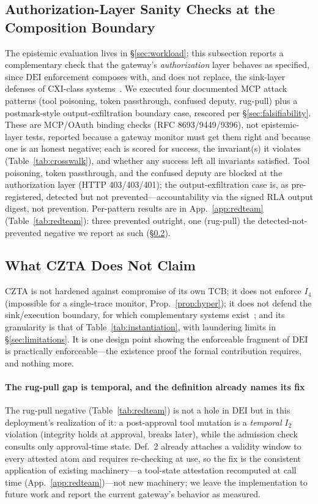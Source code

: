 \documentclass[conference]{IEEEtran}
\newcommand{\Itwo}{\ensuremath{I_2}}
\newcommand{\Ifour}{\ensuremath{I_4}}
\newcommand{\DEI}{\ensuremath{\mathrm{DEI}}}
\begin{document}
\subsection{Authorization-Layer Sanity Checks at the Composition Boundary}
\label{sec:redteam}
The epistemic evaluation lives in \S\ref{sec:workload}; this subsection reports
a complementary check that the gateway's \emph{authorization} layer behaves as
specified, since \DEI{} enforcement composes with, and does not replace, the
sink-layer defenses of CXI-class systems~\cite{cxi,camel}. We executed four
documented MCP attack patterns (tool poisoning, token passthrough, confused
deputy, rug-pull) plus a postmark-style output-exfiltration boundary case,
rescored per \S\ref{sec:falsifiability}. These are MCP/OAuth binding checks
(RFC 8693/9449/9396), not epistemic-layer tests, reported because a gateway
monitor must get them right and because one is an honest negative; each is
scored for success, the invariant(s) it violates (Table~\ref{tab:crosswalk}),
and whether any success left all invariants satisfied. Tool poisoning, token
passthrough, and the confused deputy are blocked at the authorization layer
(HTTP 403/403/401); the output-exfiltration case is, as pre-registered,
detected but not prevented---accountability via the signed RLA output digest,
not prevention. Per-pattern results are in App.~\ref{app:redteam}
(Table~\ref{tab:redteam}): three prevented outright, one (rug-pull) the
detected-not-prevented negative we report as such (\S\ref{sec:rugpull}).


\subsection{What CZTA Does Not Claim}
\label{sec:rugpull}
CZTA is not hardened against compromise of its own TCB; it does
not enforce \Ifour{} (impossible for a single-trace monitor,
Prop.~\ref{prop:hyper}); it does not defend the sink/execution
boundary, for which complementary systems exist~\cite{cxi,camel};
and its granularity is that of Table~\ref{tab:instantiation}, with
laundering limits in \S\ref{sec:limitations}. It is one design
point showing the enforceable fragment of \DEI{} is practically
enforceable---the existence proof the formal contribution
requires, and nothing more.

\paragraph*{The rug-pull gap is temporal, and the definition
already names its fix}
The rug-pull negative (Table~\ref{tab:redteam}) is not a hole in
\DEI{} but in this deployment's realization of it: a post-approval
tool mutation is a \emph{temporal} \Itwo{} violation (integrity
holds at approval, breaks later), while the admission check
consults only approval-time state. Def.~2 already attaches a
validity window to every attested atom and requires re-checking at
use, so the fix is the consistent application of existing
machinery---a tool-state attestation recomputed at call time
(App.~\ref{app:redteam})---not new machinery; we leave the
implementation to future work and report the current gateway's
behavior as measured.
\end{document}
